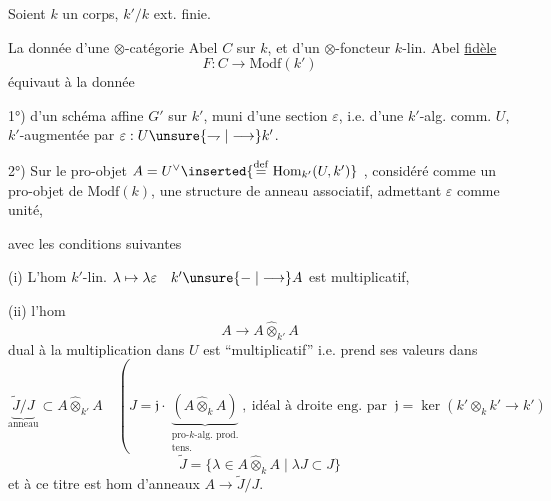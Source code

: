 Soient $k$ un corps, $k'/k$ ext. finie.

La donnée d'une $\otimes$-catégorie Abel $C$ sur $k$,
et d'un 
$\otimes$-foncteur $k$-lin. Abel  \uline{fidèle}
\[
F:C\longrightarrow\mathrm{Modf}(k')
\]
équivaut à la donnée

1°) d'un schéma affine $G'$ sur $k'$, muni d'une section $\varepsilon$,
i.e. d'une $k'$-alg. comm. $U$, 
$k'$-augmentée par $\varepsilon:U\unsure{\rightharpoondown|\longrightarrow} k'$.

2°) Sur le pro-objet $A=U^\vee
\inserted{\overset{\mathrm{def}}{=}\operatorname{Hom}_{k'}(U,k')}$
, considéré comme un pro-objet de
$\mathrm{Modf}(k)$, une structure de 
anneau associatif, admettant $\varepsilon$ comme unité,

avec les conditions suivantes

(i) L'hom $k'$-lin. $\lambda\mapsto\lambda\varepsilon\quad k'\unsure{\mathrel{-}|\longrightarrow} A$
est multiplicatif,


(ii) l'hom 
\[
A\longrightarrow A\widehat\otimes_{k'}A
\]
dual à la multiplication dans $U$ est ``multiplicatif'' i.e. prend ses valeurs
dans
\[
\underbrace{\widetilde J/J}_{\text{anneau}}\subset A\widehat\otimes_{k'}A
\quad
\left(
J=\mathfrak j\cdot
\underbrace{(A\widehat\otimes_k A)}_{\substack{\text{pro-}k\text{-alg. prod.}\\\text{tens.}}},
\ \text{idéal à droite eng. par }\
\mathfrak j=\ker(k'\otimes_k k'\longrightarrow k')
\right.
\]
\[
\widetilde J=\{\lambda\in A\widehat\otimes_k A\mid\lambda J\subset J\}
\]
et à ce titre est 
hom d'anneaux $A\longrightarrow\widetilde J/J$.
